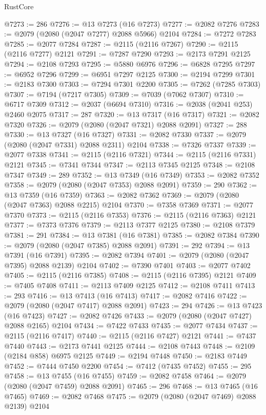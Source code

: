 \begin{lexlean}{RustCore}
\begin{coremodule}
@7273 := 286
@7276 := @13 @7273 (@16 @7273)
@7277 := @2082 @7276
@7283 := @2079 (@2080 (@2047 @7277) @2088 @5966) @2104
@7284 := @7272 @7283
@7285 := @2077 @7284
@7287 := @2115 (@2116 @7267)
@7290 := @2115 (@2116 @7277) @2121
@7291 := @7287 @7290
@7293 := @2173 @7291 @2125
@7294 := @2108 @7293
@7295 := @5880 @6976
@7296 := @6828 @7295
@7297 := @6952 @7296
@7299 := @6951 @7297 @2125
@7300 := @2194 @7299
@7301 := @2183 @7300
@7303 := @7294 @7301 @2200
@7305 := @7262 (@7285 @7303)
@7307 := @7194 (@7217 @7305)
@7309 := @7039 (@7062 @7307)
@7310 := @6717 @7309
@7312 := @2037 (@6694 @7310)
@7316 := @2038 (@2041 @253) @2460 @2075
@7317 := 287
@7320 := @13 @7317 (@16 @7317)
@7321 := @2082 @7320
@7326 := @2079 (@2080 (@2047 @7321) @2088 @2091)
@7327 := 288
@7330 := @13 @7327 (@16 @7327)
@7331 := @2082 @7330
@7337 := @2079 (@2080 (@2047 @7331) @2088 @2311) @2104
@7338 := @7326 @7337
@7339 := @2077 @7338
@7341 := @2115 (@2116 @7321)
@7344 := @2115 (@2116 @7331) @2121
@7345 := @7341 @7344
@7347 := @2113 @7345 @2125
@7348 := @2108 @7347
@7349 := 289
@7352 := @13 @7349 (@16 @7349)
@7353 := @2082 @7352
@7358 := @2079 (@2080 (@2047 @7353) @2088 @2091)
@7359 := 290
@7362 := @13 @7359 (@16 @7359)
@7363 := @2082 @7362
@7369 := @2079 (@2080 (@2047 @7363) @2088 @2215) @2104
@7370 := @7358 @7369
@7371 := @2077 @7370
@7373 := @2115 (@2116 @7353)
@7376 := @2115 (@2116 @7363) @2121
@7377 := @7373 @7376
@7379 := @2113 @7377 @2125
@7380 := @2108 @7379
@7381 := 291
@7384 := @13 @7381 (@16 @7381)
@7385 := @2082 @7384
@7390 := @2079 (@2080 (@2047 @7385) @2088 @2091)
@7391 := 292
@7394 := @13 @7391 (@16 @7391)
@7395 := @2082 @7394
@7401 := @2079 (@2080 (@2047 @7395) @2088 @2139) @2104
@7402 := @7390 @7401
@7403 := @2077 @7402
@7405 := @2115 (@2116 @7385)
@7408 := @2115 (@2116 @7395) @2121
@7409 := @7405 @7408
@7411 := @2113 @7409 @2125
@7412 := @2108 @7411
@7413 := 293
@7416 := @13 @7413 (@16 @7413)
@7417 := @2082 @7416
@7422 := @2079 (@2080 (@2047 @7417) @2088 @2091)
@7423 := 294
@7426 := @13 @7423 (@16 @7423)
@7427 := @2082 @7426
@7433 := @2079 (@2080 (@2047 @7427) @2088 @2165) @2104
@7434 := @7422 @7433
@7435 := @2077 @7434
@7437 := @2115 (@2116 @7417)
@7440 := @2115 (@2116 @7427) @2121
@7441 := @7437 @7440
@7443 := @2173 @7441 @2125
@7444 := @2108 @7443
@7448 := @2109 (@2184 @858) @6975 @2125
@7449 := @2194 @7448
@7450 := @2183 @7449
@7452 := @7444 @7450 @2200
@7454 := @7412 (@7435 @7452)
@7455 := 295
@7458 := @13 @7455 (@16 @7455)
@7459 := @2082 @7458
@7464 := @2079 (@2080 (@2047 @7459) @2088 @2091)
@7465 := 296
@7468 := @13 @7465 (@16 @7465)
@7469 := @2082 @7468
@7475 := @2079 (@2080 (@2047 @7469) @2088 @2139) @2104

\end{coremodule}
\end{lexlean}
